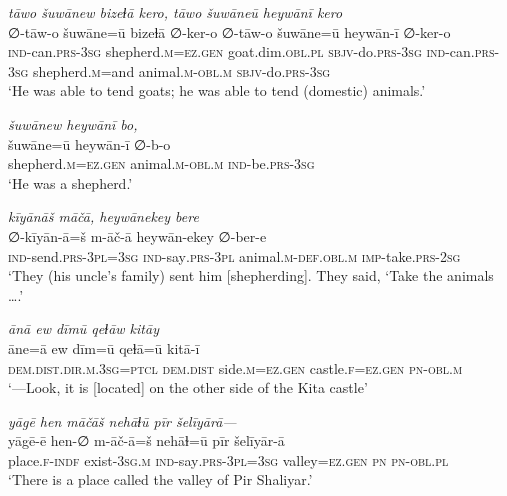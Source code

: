 \ea \label{ŽP.16}
\textit{tāwo šuwānew bizeɫā kero, tāwo šuwāneū heywānī kero} \\ 
\gll ∅-tāw-o šuwāne=ū bizeɫā ∅-ker-o ∅-tāw-o šuwāne=ū heywān-ī ∅-ker-o \\ 
 \textsc{ind-}can\textsc{.prs}\textsc{-3sg} shepherd\textsc{.m}\textsc{\textsc{=ez.gen}} goat.dim\textsc{.obl}\textsc{.pl} \textsc{sbjv-}do\textsc{.prs}\textsc{-3sg} \textsc{ind-}can\textsc{.prs}\textsc{-3sg} shepherd\textsc{.m}=and animal\textsc{.m}\textsc{-obl}\textsc{.m} \textsc{sbjv-}do\textsc{.prs}\textsc{-3sg} \\ 
\glt `He was able to tend goats; he was able to tend (domestic) animals.'
\z 
 
\ea \label{ŽP.17}
\textit{šuwānew heywānī bo,} \\ 
\gll šuwāne=ū heywān-ī ∅-b-o \\ 
 shepherd\textsc{.m}\textsc{\textsc{=ez.gen}} animal\textsc{.m}\textsc{-obl}\textsc{.m} \textsc{ind-}be\textsc{.prs}\textsc{-3sg} \\ 
\glt `He was a shepherd.'
\z 
 
\ea \label{ŽP.18}
\textit{kīyānāš māčā, heywānekey bere} \\ 
\gll ∅-kīyān-ā=š m-āč-ā heywān-ekey ∅-ber-e \\ 
 \textsc{ind-}send\textsc{.prs}\textsc{-3pl}\textsc{=3sg} \textsc{ind-}say\textsc{.prs}\textsc{-3pl} animal\textsc{.m}\textsc{-def}\textsc{.obl}\textsc{.m} \textsc{imp-}take\textsc{.prs}-\textsc{2sg} \\ 
\glt `They (his uncle’s family) sent him [shepherding]. They said, ‘Take the animals ….'
\z 
 
\ea \label{ŽP.19}
\textit{ānā ew dīmū qeɫāw kitāy} \\ 
\gll āne=ā ew dīm=ū qeɫā=ū kitā-ī \\ 
 \textsc{dem.dist}\textsc{.dir}\textsc{.m}\textsc{.3sg}=\textsc{ptcl} \textsc{dem.dist} side\textsc{.m}\textsc{\textsc{=ez.gen}} castle\textsc{.f}\textsc{\textsc{=ez.gen}} \textsc{pn}\textsc{-obl}\textsc{.m} \\ 
\glt `—Look, it is [located] on the other side of the Kita castle'
\z 
 
\ea \label{ŽP.20}
\textit{yāgē hen māčāš nehāɫū pīr šelīyārā—} \\ 
\gll yāgē-ē hen-∅ m-āč-ā=š nehāɫ=ū pīr šelīyār-ā \\ 
 place\textsc{.f}\textsc{-indf} exist\textsc{-3sg}\textsc{.m} \textsc{ind-}say\textsc{.prs}\textsc{-3pl}\textsc{=3sg} valley\textsc{\textsc{=ez.gen}} \textsc{pn} \textsc{pn}\textsc{-obl}\textsc{.pl} \\ 
\glt `There is a place called the valley of Pir Shaliyar.'
\z 
 
